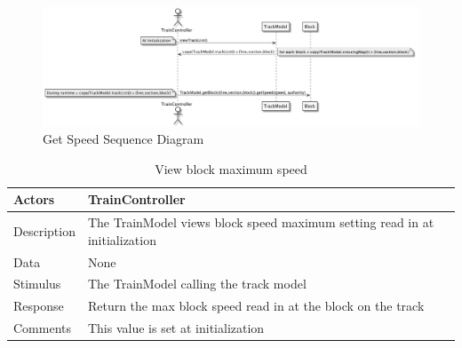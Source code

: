 \documentclass[]{article}
\begin{document}
\begin{figure}[H]
	\centering
	\includegraphics[width=\textwidth]{getSpeed.png}
	\caption{Get Speed Sequence Diagram}
\end{figure}
\begin{table}[H]
	\centering
	\caption{View block maximum speed}
	\begin{tabular}{|l|l|}
		\hline
		Actors & \parbox[t]{10cm}{TrainController} \\ \hline
		Description & \parbox[t]{10cm}{The TrainModel views block speed maximum setting read in at initialization} \\ \hline
		Data &  \parbox[t]{10cm}{None} \\ \hline
		Stimulus &  \parbox[t]{10cm}{The TrainModel calling the track model} \\ \hline
		Response & \parbox[t]{10cm}{Return the max block speed read in at the block on the track}\\ \hline
		Comments & \parbox[t]{10cm}{This value is set at initialization}  \\ \hline
	\end{tabular}
\end{table}
\end{document}
